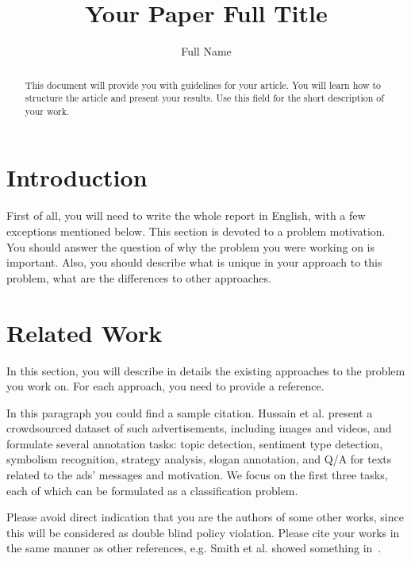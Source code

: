 \documentclass{zapiski}
\date{}
\begin{document}
\title[Your Paper Short Title]{Your Paper Full Title}


\author[Author]{Full Name}
\address[F.~Name]{Address}

\begin{abstract}
This document will provide you with guidelines for your article. You will learn how to structure the article and present your results. Use this field for the short description of your work.
\end{abstract}


\maketitle

\section{Introduction}
\label{sec:intro}

First of all, you will need to write the whole report in English, with a few exceptions mentioned below.
This section is devoted to a problem motivation. You should answer the question of why the problem you were working on is important. Also, you should describe what is unique in your approach to this problem, what are the differences to other approaches.

\section{Related Work}
\label{sec:related}
In this section, you will describe in details the existing approaches to the problem you work on. For each approach, you need to provide a reference. 

In this paragraph you could find a sample citation.
Hussain et al. \cite{hussain2017automatic} present a crowdsourced dataset of such advertisements, including images and videos, and formulate several annotation tasks: topic detection, sentiment type detection, symbolism recognition, strategy analysis, slogan annotation, and Q/A for texts related to the ads' messages and motivation. We focus on the first three tasks, each of which can be formulated as a classification problem.

Please avoid direct indication that you are the authors of some other works, since this will be considered as double blind policy violation. Please cite your works in the same manner as other references, e.g. Smith et al. showed something in~\cite{smith2007overview}. 
\end{document}
